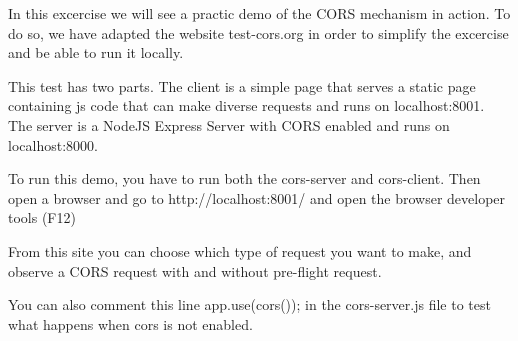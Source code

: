 \begin{Exercise}[label={websec-cors-practs}]
	In this excercise we will see a practic demo of the CORS mechanism in action. To do so, we have adapted the website test-cors.org in order to simplify the excercise and be able to run it locally. 
	
	This test has two parts. The client is a simple page that serves a static page containing js code that can make diverse requests and runs on localhost:8001. The server is a NodeJS Express Server with CORS enabled and runs on localhost:8000.
	
	To run this demo, you have to run both the cors-server and cors-client. Then open a browser and go to http://localhost:8001/ and open the browser developer tools (F12)
	
	From this site you can choose which type of request you want to make, and observe a CORS request with and without pre-flight request. 
	
	You can also comment this line app.use(cors()); in the cors-server.js file to test what happens when cors is not enabled.
\end{Exercise}

\begin{Answer}[ref={websec-cors-practs}]
\end{Answer}